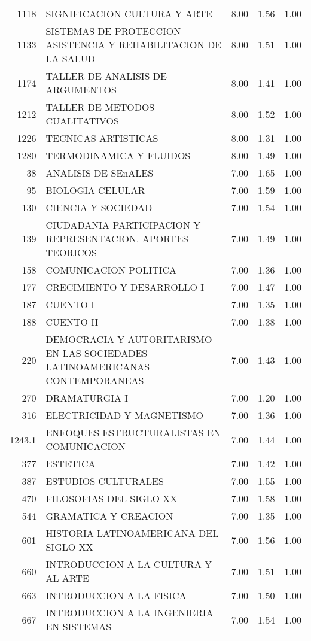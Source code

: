 \documentclass[12pt]{article}
\begin{document}
\begin{table}[ht]
\begin{tabular}{rlrrr}
  1118 & SIGNIFICACION CULTURA Y ARTE & 8.00 & 1.56 & 1.00 \\ 
  1133 & SISTEMAS DE PROTECCION ASISTENCIA Y REHABILITACION DE LA SALUD & 8.00 & 1.51 & 1.00 \\ 
  1174 & TALLER DE ANALISIS DE ARGUMENTOS & 8.00 & 1.41 & 1.00 \\ 
  1212 & TALLER DE METODOS CUALITATIVOS & 8.00 & 1.52 & 1.00 \\ 
  1226 & TECNICAS ARTISTICAS & 8.00 & 1.31 & 1.00 \\ 
  1280 & TERMODINAMICA Y FLUIDOS & 8.00 & 1.49 & 1.00 \\ 
  38 & ANALISIS DE SEnALES & 7.00 & 1.65 & 1.00 \\ 
  95 & BIOLOGIA CELULAR & 7.00 & 1.59 & 1.00 \\ 
  130 & CIENCIA Y SOCIEDAD & 7.00 & 1.54 & 1.00 \\ 
  139 & CIUDADANIA PARTICIPACION Y REPRESENTACION. APORTES TEORICOS & 7.00 & 1.49 & 1.00 \\ 
  158 & COMUNICACION POLITICA & 7.00 & 1.36 & 1.00 \\ 
  177 & CRECIMIENTO Y DESARROLLO I & 7.00 & 1.47 & 1.00 \\ 
  187 & CUENTO I & 7.00 & 1.35 & 1.00 \\ 
  188 & CUENTO II & 7.00 & 1.38 & 1.00 \\ 
  220 & DEMOCRACIA Y AUTORITARISMO EN LAS SOCIEDADES LATINOAMERICANAS CONTEMPORANEAS & 7.00 & 1.43 & 1.00 \\ 
  270 & DRAMATURGIA I & 7.00 & 1.20 & 1.00 \\ 
  316 & ELECTRICIDAD Y MAGNETISMO & 7.00 & 1.36 & 1.00 \\ 
  1243.1 & ENFOQUES ESTRUCTURALISTAS EN COMUNICACION & 7.00 & 1.44 & 1.00 \\ 
  377 & ESTETICA & 7.00 & 1.42 & 1.00 \\ 
  387 & ESTUDIOS CULTURALES & 7.00 & 1.55 & 1.00 \\ 
  470 & FILOSOFIAS DEL SIGLO XX & 7.00 & 1.58 & 1.00 \\ 
  544 & GRAMATICA Y CREACION & 7.00 & 1.35 & 1.00 \\ 
  601 & HISTORIA LATINOAMERICANA DEL SIGLO XX & 7.00 & 1.56 & 1.00 \\ 
  660 & INTRODUCCION A LA CULTURA Y AL ARTE & 7.00 & 1.51 & 1.00 \\ 
  663 & INTRODUCCION A LA FISICA & 7.00 & 1.50 & 1.00 \\ 
  667 & INTRODUCCION A LA INGENIERIA EN SISTEMAS & 7.00 & 1.54 & 1.00 \\ 

\end{tabular}
\end{table}
\end{document}
